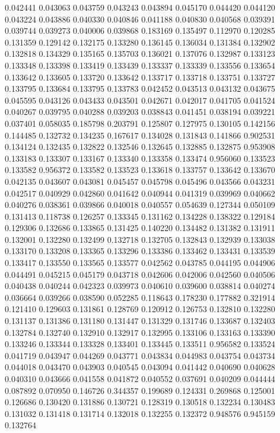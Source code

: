 0.042441
0.043063
0.043759
0.043243
0.043894
0.045170
0.044420
0.044120
0.043224
0.043886
0.040330
0.040846
0.041188
0.040830
0.040568
0.039391
0.039744
0.039273
0.040006
0.039868
0.183169
0.135497
0.112970
0.120285
0.131359
0.129142
0.132175
0.133280
0.136145
0.136034
0.131384
0.132902
0.132818
0.134329
0.135165
0.135703
0.136021
0.137076
0.132987
0.133123
0.133348
0.133398
0.133419
0.133439
0.133337
0.133339
0.133556
0.133654
0.133642
0.133605
0.133720
0.133642
0.133717
0.133718
0.133751
0.133727
0.133795
0.133684
0.133795
0.133783
0.042452
0.043513
0.043132
0.043675
0.045595
0.043126
0.043433
0.043501
0.042671
0.042017
0.041705
0.041524
0.040267
0.039795
0.040288
0.039203
0.038843
0.041451
0.038194
0.039221
0.037401
0.058035
0.185798
0.203791
0.125807
0.127975
0.130105
0.142156
0.144485
0.132732
0.134235
0.167617
0.134028
0.131843
0.141866
0.902531
0.134124
0.132435
0.132822
0.132546
0.132645
0.132885
0.132875
0.953908
0.133183
0.133307
0.133167
0.133340
0.133358
0.133474
0.956060
0.133523
0.133582
0.956372
0.133582
0.133523
0.133618
0.133757
0.133642
0.133670
0.042135
0.043607
0.043081
0.045457
0.045798
0.045496
0.043566
0.043231
0.042517
0.040929
0.042860
0.041642
0.040944
0.041319
0.039969
0.040662
0.040276
0.038361
0.039866
0.040018
0.040557
0.054639
0.127344
0.050109
0.131413
0.118738
0.126257
0.133345
0.131162
0.134228
0.138322
0.129184
0.129306
0.132686
0.133865
0.131425
0.140220
0.134482
0.131382
0.131911
0.132001
0.132280
0.132499
0.132718
0.132705
0.132843
0.132939
0.133038
0.133170
0.133208
0.133365
0.133296
0.133386
0.133462
0.133431
0.133539
0.133417
0.133550
0.133565
0.133577
0.042562
0.043785
0.044195
0.044906
0.044491
0.045215
0.045179
0.043718
0.042606
0.042006
0.042560
0.040506
0.040438
0.040244
0.042323
0.039973
0.040610
0.039600
0.038814
0.040274
0.036664
0.039266
0.038590
0.052285
0.118643
0.178230
0.177882
0.321914
0.121410
0.129603
0.131861
0.128769
0.120912
0.126753
0.132810
0.132280
0.131137
0.131386
0.131180
0.131447
0.131329
0.131746
0.133687
0.132403
0.132784
0.132740
0.132910
0.132917
0.132995
0.133106
0.133163
0.133390
0.133246
0.133344
0.133328
0.133401
0.133445
0.133511
0.956582
0.133524
0.041719
0.043947
0.044269
0.043771
0.043834
0.044983
0.043754
0.043734
0.044018
0.043470
0.043903
0.040545
0.043094
0.041442
0.040690
0.040628
0.040310
0.043666
0.041558
0.041872
0.040552
0.037691
0.040209
0.044444
0.087892
0.070950
0.146726
0.344357
0.199689
0.124331
0.269868
0.125001
0.126686
0.130420
0.131886
0.130721
0.128319
0.130518
0.132234
0.130483
0.131032
0.131418
0.131714
0.132018
0.132255
0.132372
0.948576
0.945159
0.132764
